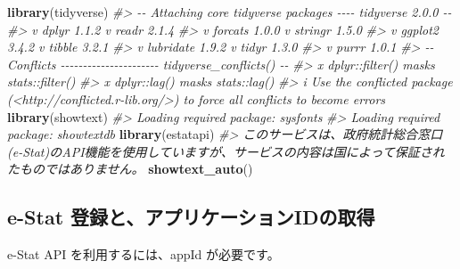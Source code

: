\documentclass[
  xelatex, ja=standard]{bxjsbook}
\newenvironment{Shaded}{\begin{snugshade}}{\end{snugshade}}
\newcommand{\CommentTok}[1]{\textcolor[rgb]{0.56,0.35,0.01}{\textit{#1}}}
\newcommand{\FunctionTok}[1]{\textcolor[rgb]{0.13,0.29,0.53}{\textbf{#1}}}
\newcommand{\NormalTok}[1]{#1}
\theoremstyle{definition}
\theoremstyle{definition}
\theoremstyle{definition}
\theoremstyle{definition}
\theoremstyle{remark}
\begin{document}
\begin{Shaded}
\begin{Highlighting}[]
\FunctionTok{library}\NormalTok{(tidyverse)}
\CommentTok{\#\textgreater{} {-}{-} Attaching core tidyverse packages {-}{-}{-}{-} tidyverse 2.0.0 {-}{-}}
\CommentTok{\#\textgreater{} v dplyr     1.1.2     v readr     2.1.4}
\CommentTok{\#\textgreater{} v forcats   1.0.0     v stringr   1.5.0}
\CommentTok{\#\textgreater{} v ggplot2   3.4.2     v tibble    3.2.1}
\CommentTok{\#\textgreater{} v lubridate 1.9.2     v tidyr     1.3.0}
\CommentTok{\#\textgreater{} v purrr     1.0.1     }
\CommentTok{\#\textgreater{} {-}{-} Conflicts {-}{-}{-}{-}{-}{-}{-}{-}{-}{-}{-}{-}{-}{-}{-}{-}{-}{-}{-}{-}{-}{-} tidyverse\_conflicts() {-}{-}}
\CommentTok{\#\textgreater{} x dplyr::filter() masks stats::filter()}
\CommentTok{\#\textgreater{} x dplyr::lag()    masks stats::lag()}
\CommentTok{\#\textgreater{} i Use the conflicted package (\textless{}http://conflicted.r{-}lib.org/\textgreater{}) to force all conflicts to become errors}
\FunctionTok{library}\NormalTok{(showtext)}
\CommentTok{\#\textgreater{} Loading required package: sysfonts}
\CommentTok{\#\textgreater{} Loading required package: showtextdb}
\FunctionTok{library}\NormalTok{(estatapi)}
\CommentTok{\#\textgreater{} このサービスは、政府統計総合窓口(e{-}Stat)のAPI機能を使用していますが、サービスの内容は国によって保証されたものではありません。}
\FunctionTok{showtext\_auto}\NormalTok{()}
\end{Highlighting}
\end{Shaded}

\hypertarget{e-stat-ux767bux9332ux3068ux30a2ux30d7ux30eaux30b1ux30fcux30b7ux30e7ux30f3idux306eux53d6ux5f97}{%
\subsection{e-Stat 登録と、アプリケーションIDの取得}\label{e-stat-ux767bux9332ux3068ux30a2ux30d7ux30eaux30b1ux30fcux30b7ux30e7ux30f3idux306eux53d6ux5f97}}

e-Stat API を利用するには、appId が必要です。
\end{document}
